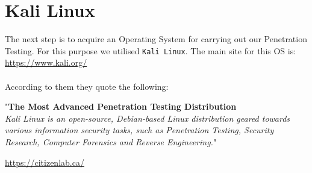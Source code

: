 \documentclass[a4paper, 12pt, titlepage]{report}
\begin{document}
\section{Kali Linux}
The next step is to acquire an Operating System for carrying out our Penetration Testing. For this purpose we utilised \texttt{Kali Linux}. The main site for this OS is: \url{https://www.kali.org/}\\\\
According to them they quote the following:
\begin{displayquote}
"\textbf{The Most Advanced Penetration Testing Distribution}\\
\textit{Kali Linux is an open-source, Debian-based Linux distribution geared towards various information security tasks, such as Penetration Testing, Security Research, Computer Forensics and Reverse Engineering.}"
\end{displayquote}
\url{https://citizenlab.ca/}
\printbibliography[heading=bibintoc]
\end{document}
